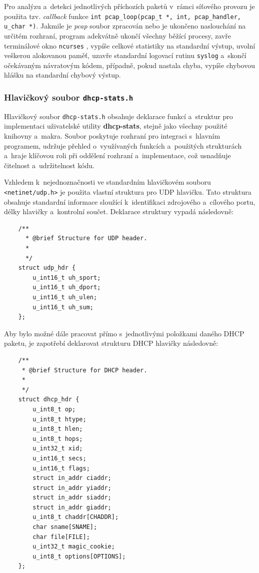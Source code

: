 \documentclass[a4paper, 11pt]{article}
\begin{document}
Pro analýzu a~detekci jednotlivých příchozích paketů v~rámci síťového provozu je použita tzv. \textit{callback} funkce \texttt{int pcap\_loop(pcap\_t *, int, pcap\_handler, u\_char *)}.
Jakmile je \textit{pcap} soubor zpracován nebo je ukončeno naslouchání na určitém rozhraní, program adekvátně ukončí všechny běžící procesy, zavře terminálové okno \texttt{ncurses} \cite{ncurses}, vypíše celkové statistiky na standardní výstup, uvolní veškerou alokovanou paměť, uzavře standardní logovací rutinu \texttt{syslog} \cite{syslog} a~skončí očekávaným návratovým kódem, případně, pokud nastala chyba, vypíše chybovou hlášku na standardní chybový výstup.

\subsubsection{Hlavičkový soubor \texttt{dhcp-stats.h}}
Hlavičkový soubor \texttt{dhcp-stats.h} obsahuje deklarace funkcí a~struktur pro implementaci uživatelské utility \textbf{dhcp-stats}, stejně jako všechny použité knihovny a~makra.
Soubor poskytuje rozhraní pro integraci s~hlavním programem, udržuje přehled o~využívaných funkcích a~použitých strukturách a~hraje klíčovou roli při oddělení rozhraní a~implementace, což usnadňuje čitelnost a~udržitelnost kódu.

Vzhledem k~nejednoznačnosti ve standardním hlavičkovém souboru \texttt{<netinet/udp.h>} \cite{udp} je použita vlastní struktura pro UDP hlavičku.
Tato struktura obsahuje standardní informace sloužící k~identifikaci zdrojového a~cílového portu, délky hlavičky a~kontrolní součet.
Deklarace struktury vypadá následovně:

\begin{verbatim}
    /**
      * @brief Structure for UDP header.
      * 
      */
    struct udp_hdr {
        u_int16_t uh_sport;
        u_int16_t uh_dport;
        u_int16_t uh_ulen;
        u_int16_t uh_sum;
    };
\end{verbatim}

Aby bylo možné dále pracovat přímo s~jednotlivými položkami daného DHCP paketu, je zapotřebí deklarovat strukturu DHCP hlavičky následovně:

\begin{verbatim}
    /**
     * @brief Structure for DHCP header.
     * 
     */
    struct dhcp_hdr {
        u_int8_t op;
        u_int8_t htype;
        u_int8_t hlen;
        u_int8_t hops;
        u_int32_t xid;
        u_int16_t secs;
        u_int16_t flags;
        struct in_addr ciaddr;
        struct in_addr yiaddr;
        struct in_addr siaddr;
        struct in_addr giaddr;
        u_int8_t chaddr[CHADDR];
        char sname[SNAME];
        char file[FILE];
        u_int32_t magic_cookie;
        u_int8_t options[OPTIONS];
    };
\end{verbatim}
\end{document}
